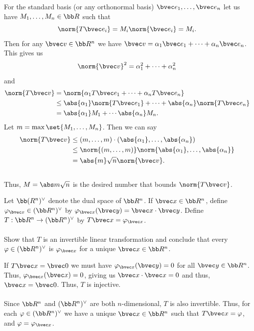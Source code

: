 \documentclass[12pt, letterpaper]{hmcpset}
\begin{document}
\begin{solution}
	For the standard basis (or any orthonormal basis) $\bvec e_1, \ldots, \bvec e_n$ let us have $M_1, \ldots, M_n \in \bb R$ such that
	\[
		\norm{T \bvec e_i} = M_i \norm{\bvec e_i} = M_i.
	\]
	Then for any $\bvec v \in \bb R^n$ we have $\bvec v = \alpha_1 \bvec e_1 + \cdots + \alpha_n \bvec e_n$. This gives us
	\[
		\norm{\bvec v}^2 = \alpha_1^2 + \cdots + \alpha_n^2
	\]
	and
	\[
		\begin{split}
			\norm{T \bvec v} & = \norm{\alpha_1 T \bvec e_1 + \cdots + \alpha_n T \bvec e_n} \\
					   & \le \abs{\alpha_1} \norm{T \bvec e_1} + \cdots + \abs{\alpha_n} \norm{T \bvec e_n} \\
					   & = \abs{\alpha_1} M_1 + \cdots \abs{\alpha_n} M_n.
		\end{split}
	\]
	Let $m = \max \set{M_1, \ldots, M_n}$. Then we can say
	\[
		\begin{split}
			\norm{T \bvec v} & \le (m, \ldots, m) \cdot (\abs{\alpha_1}, \ldots, \abs{\alpha_n}) \\
					 & \le \norm{(m, \ldots, m)} \norm{\abs{\alpha_1}, \ldots, \abs{\alpha_n}} \\
					 & = \abs{m} \sqrt{n} \norm{\bvec v}.
		\end{split}
	\] \\
	Thus, $M = \abs m \sqrt n$ is the desired number that bounds $\norm{T \bvec v}$.
\end{solution}

\pagebreak

\begin{problem}[12]
	Let $\bb (R^n)^\vee$ denote the dual space of $\bb R^n$. If $\bvec x \in \bb R^n$, define $\varphi_{\bvec x} \in (\bb R^n)^\vee$ by $\varphi_{\bvec x}(\bvec y) = \bvec x \cdot \bvec y$. Define $T : \bb R^n \to (\bb R^n)^\vee$ by $T \bvec x = \varphi_{\bvec x}$. \\\\
	Show that $T$ is an invertible linear transformation and conclude that every $\varphi \in (\bb R^n)^\vee$ is $\varphi_{\bvec x}$ for a unique $\bvec x \in \bb R^n$.
\end{problem}

\begin{solution}
	If $T \bvec x = \bvec 0$ we must have $\varphi_{\bvec x} (\bvec y) = 0$ for all $\bvec y \in \bb R^n$. Thus, $\varphi_{\bvec x}(\bvec x) = 0$, giving us $\bvec x \cdot \bvec x = 0$ and thus, $\bvec x = \bvec 0$. Thus, $T$ is injective. \\\\
	Since $\bb R^n$ and $(\bb R^n)^\vee$ are both $n$-dimensional, $T$ is also invertible. Thus, for each $\varphi \in (\bb R^n)^\vee$ we have a unique $\bvec x \in \bb R^n$ such that $T \bvec x = \varphi$, and $\varphi = \varphi_{\bvec x}$.
\end{solution}
\end{document}
